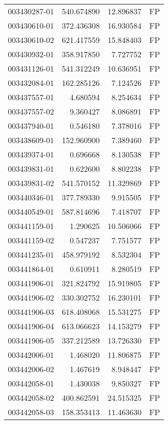 \begin{tabular}{lrrl}
003430287-01 &  540.674890 &    12.896837 &   FP \\
003430610-01 &  372.436308 &    16.930584 &   FP \\
003430610-02 &  621.417559 &    15.848403 &   FP \\
003430932-01 &  358.917850 &     7.727752 &   FP \\
003431126-01 &  541.312249 &    10.636951 &   FP \\
003432084-01 &  162.285126 &     7.124526 &   FP \\
003437557-01 &    4.680594 &     8.254634 &   FP \\
003437557-02 &    9.360427 &     8.086891 &   FP \\
003437940-01 &    0.546180 &     7.378016 &   FP \\
003438609-01 &  152.960900 &     7.389460 &   FP \\
003439374-01 &    0.696668 &     8.130538 &   FP \\
003439831-01 &    0.622600 &     8.802238 &   FP \\
003439831-02 &  541.570152 &    11.329869 &   FP \\
003440346-01 &  377.789330 &     9.915505 &   FP \\
003440549-01 &  587.814696 &     7.418707 &   FP \\
003441159-01 &    1.290625 &    10.506066 &   FP \\
003441159-02 &    0.547237 &     7.751577 &   FP \\
003441235-01 &  458.979192 &     8.532304 &   FP \\
003441864-01 &    0.610911 &     8.280519 &   FP \\
003441906-01 &  321.824792 &    15.919805 &   FP \\
003441906-02 &  330.302752 &    16.230101 &   FP \\
003441906-03 &  618.408068 &    15.531275 &   FP \\
003441906-04 &  613.066623 &    14.153279 &   FP \\
003441906-05 &  337.212589 &    13.726330 &   FP \\
003442006-01 &    1.468020 &    11.806875 &   FP \\
003442006-02 &    1.467619 &     8.948447 &   FP \\
003442058-01 &    1.430038 &     9.850327 &   FP \\
003442058-02 &  400.862591 &    24.515325 &   FP \\
003442058-03 &  158.353413 &    11.463630 &   FP \\

\end{tabular}
